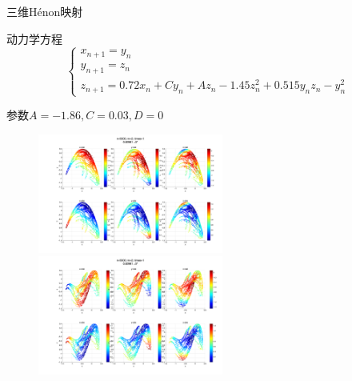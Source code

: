 \documentclass{beamer}
\begin{document}
	\begin{frame}{三维H\'{e}non映射}
		\begin{block}{动力学方程}
		\begin{equation*}
		\begin{cases}
		x_{n+1}=y_n\\
		y_{n+1}=z_n\\
		z_{n+1}=0.72x_n+Cy_n+Az_n-1.45z_n^2+0.515y_nz_n-y_n^2
		\end{cases}
		\end{equation*}
	\end{block}
	参数$A=-1.86,C=0.03,D=0$
		\begin{figure}
			\begin{minipage}{0.45\linewidth}
				\centerline{\includegraphics[width=2.4in]{images/Henon3d_Koopman_n5000m2_figure1}}
			\end{minipage}
			\hfill
			\begin{minipage}{0.45\linewidth}
				\centerline{\includegraphics[width=2.4in]{images/Henon3d2_Koopman_n5000m2_figure1}}
			\end{minipage}
		\end{figure}
	\end{frame}
%		
\end{document}
